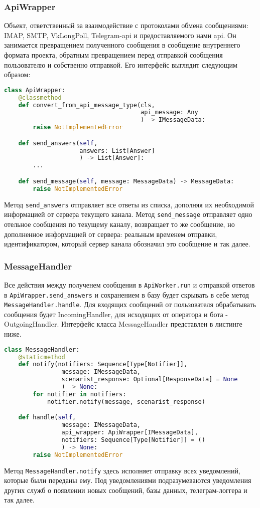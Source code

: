     \subsubsection{ApiWrapper}
    Объект, ответственный за взаимодействие с протоколами обмена сообщениями: IMAP, SMTP, VkLongPoll,
    Telegram-api и предоставляемого нами api.
    Он занимается превращением полученного сообщения в сообщение внутреннего формата проекта,
    обратным превращением перед отправкой сообщения пользователю и собственно отправкой.
    Его интерфейс выглядит следующим образом:
\begin{lstlisting}[language=Python]
class ApiWrapper:
    @classmethod
    def convert_from_api_message_type(cls,
                                      api_message: Any
                                      ) -> IMessageData:
        raise NotImplementedError

    def send_answers(self,
                     answers: List[Answer]
                     ) -> List[Answer]:
        ...

    def send_message(self, message: MessageData) -> MessageData:
        raise NotImplementedError
\end{lstlisting}
    Метод \lstinline{send_answers} отправляет все ответы из списка, дополняя их
    необходимой информацией от сервера текущего канала. 
    Метод \lstinline{send_message} отправляет одно отельное сообщения по текущему каналу,
    возвращает то же сообщение, но дополненное информацией от сервера: реальным временем
    отправки, идентификатором, который сервер канала обозначил это сообщение и так далее.

    \subsubsection{MessageHandler}
    Все действия между полученем сообщения в \lstinline{ApiWorker.run} и отправкой ответов
    в \lstinline{ApiWrapper.send_answers} и сохранением в базу будет скрывать в себе метод
    \lstinline{MessageHandler.handle}. Для входящих сообщений от пользователя обрабатывать
    сообщения будет IncomingHandler, для исходящих от оператора и бота - OutgoingHandler.
    Интерфейс класса MessageHandler представлен в листинге ниже.
\begin{lstlisting}[language=Python]
class MessageHandler:
    @staticmethod
    def notify(notifiers: Sequence[Type[Notifier]],
                message: IMessageData,
                scenarist_response: Optional[ResponseData] = None
                ) -> None:
        for notifier in notifiers:
            notifier.notify(message, scenarist_response)

    def handle(self,
                message: IMessageData,
                api_wrapper: ApiWrapper[IMessageData],
                notifiers: Sequence[Type[Notifier]] = ()
                ) -> None:
        raise NotImplementedError
\end{lstlisting}
    Метод \lstinline{MessageHandler.notify} здесь исполняет отправку всех уведомлений,
    которые были переданы ему. Под уведомлениями подразумеваются уведомления других служб
    о появлении новых сообщений, базы данных, телеграм-логгера и так далее.

